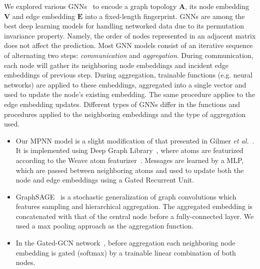 \documentclass[conference]{IEEEtran}
\begin{document}
We explored various GNNs~\cite{duvenaud_convolutional_2015-1,kipf_semi-supervised_2016} to encode a graph topology $\mathbf{A}$, its node embedding $\mathbf{V}$ and edge embedding $\mathbf{E}$ into a fixed-length fingerprint. GNNs are among the best deep learning models for handling networked data due to its permutation invariance property. Namely, the order of nodes represented in an adjacent matrix does not affect the prediction. Most GNN models consist of an iterative sequence of alternating two steps: \textit{communication} and \textit{aggregation}. During communication, each node will gather its neighboring node embeddings and incident edge embeddings of previous step. During aggregation, trainable functions (e.g. neural networks) are applied to these embeddings, aggregated into a single vector and used to update the node's existing embedding. The same procedure applies to the edge embedding updates.  Different types of GNNs differ in the functions and procedures applied to the neighboring embeddings and the type of aggregation used. 


\begin{itemize}[leftmargin=*]
\item Our MPNN model is a slight modification of that presented in Gilmer \textit{et al.}~\cite{gilmer_neural_2017}. It is implemented using Deep Graph Library~\cite{wang_deep_2019}, where atoms are featurized according to the Weave atom featurizer~\cite{kearnes2016molecular}. Messages are learned by a MLP, which are passed between neighboring atoms and used to update both the node and edge embeddings using a Gated Recurrent Unit.

\item GraphSAGE~\cite{yujia2016gated,bresson_residual_2018} is a stochastic generalization of graph convolutions which features sampling and hierarchical aggregation. The aggregated embedding is concatenated with that of the central node before a fully-connected layer. We used a max pooling approach as the aggregation function.

\item In the Gated-GCN network~\cite{yujia2016gated,bresson_residual_2018}, before aggregation each neighboring node embedding is gated (softmax) by a trainable linear combination of both nodes. 

\end{itemize}
\end{document}

